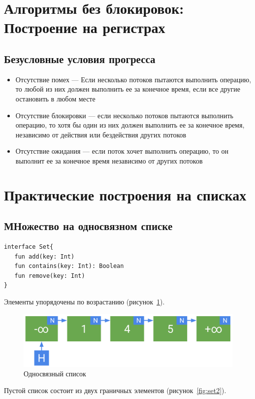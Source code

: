 \documentclass[10pt,a4paper,oneside,titlepage]{article}
\theoremstyle{plain}
\theoremstyle{defenition}
\begin{document}
\section{Алгоритмы без блокировок: Построение на регистрах}
\subsection{Безусловные условия прогресса}
\begin{itemize}
	\item Отсутствие помех --- Если несколько потоков пытаются выполнить операцию, то любой из них должен выполнить ее за конечное время, если все другие остановить в любом месте
	\item Отсутствие блокировки --- если несколько потоков пытаются выполнить операцию, то хотя бы один из них должен выполнить ее за конечное время, независимо от действия или бездействия других потоков
	\item Отсутствие ожидания --- если поток хочет выполнить операцию, то он выполнит ее за конечное время независимо от других потоков
\end{itemize}

\section{Практические построения на списках}

\subsection{МНожество на односвязном списке}

\begin{lstlisting}
interface Set{
   fun add(key: Int)
   fun contains(key: Int): Boolean
   fun remove(key: Int)
}
\end{lstlisting}

Элементы упорядочены по возрастанию (рисунок~\ref{fig:set1}).

\begin{figure}
	\centering
	\includegraphics[width=0.4\linewidth]{pictures/Set1}
	\caption{Односвязный список}
	\label{fig:set1}
\end{figure}

Пустой список состоит из двух граничных элементов (рисунок~\ref{fig:set2}).
\end{document}
